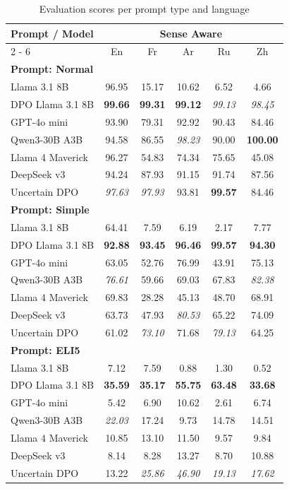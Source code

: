 \documentclass{article}%
\begin{document}
%
\normalsize%


\begin{table}[h!]%
\centering%
\small%
\setlength{\tabcolsep}{4pt}%
\begin{tabular}{@{}lccccc@{}}%
\toprule%
\textbf{Prompt / Model} & \multicolumn{5}{c}{\textbf{Sense Aware}} \\%
\cmidrule(lr){2%
-%
6}%
&En&Fr&Ar&Ru&Zh\\%
\midrule%
\multicolumn{6}{l}{\textbf{Prompt: Normal}} \\%
Llama 3.1 8B&96.95&15.17&10.62&6.52&4.66\\%
DPO Llama 3.1 8B&\textbf{99.66}&\textbf{99.31}&\textbf{99.12}&\textit{99.13}&\textit{98.45}\\%
GPT{-}4o mini&93.90&79.31&92.92&90.43&84.46\\%
Qwen3{-}30B A3B&94.58&86.55&\textit{98.23}&90.00&\textbf{100.00}\\%
Llama 4 Maverick&96.27&54.83&74.34&75.65&45.08\\%
DeepSeek v3&94.24&87.93&91.15&91.74&87.56\\%
Uncertain DPO&\textit{97.63}&\textit{97.93}&93.81&\textbf{99.57}&84.46\\%
\midrule%
\multicolumn{6}{l}{\textbf{Prompt: Simple}} \\%
Llama 3.1 8B&64.41&7.59&6.19&2.17&7.77\\%
DPO Llama 3.1 8B&\textbf{92.88}&\textbf{93.45}&\textbf{96.46}&\textbf{99.57}&\textbf{94.30}\\%
GPT{-}4o mini&63.05&52.76&76.99&43.91&75.13\\%
Qwen3{-}30B A3B&\textit{76.61}&59.66&69.03&67.83&\textit{82.38}\\%
Llama 4 Maverick&69.83&28.28&45.13&48.70&68.91\\%
DeepSeek v3&63.73&47.93&\textit{80.53}&65.22&74.09\\%
Uncertain DPO&61.02&\textit{73.10}&71.68&\textit{79.13}&64.25\\%
\midrule%
\multicolumn{6}{l}{\textbf{Prompt: ELI5}} \\%
Llama 3.1 8B&7.12&7.59&0.88&1.30&0.52\\%
DPO Llama 3.1 8B&\textbf{35.59}&\textbf{35.17}&\textbf{55.75}&\textbf{63.48}&\textbf{33.68}\\%
GPT{-}4o mini&5.42&6.90&10.62&2.61&6.74\\%
Qwen3{-}30B A3B&\textit{22.03}&17.24&9.73&14.78&14.51\\%
Llama 4 Maverick&10.85&13.10&11.50&9.57&9.84\\%
DeepSeek v3&8.14&8.28&13.27&8.70&10.88\\%
Uncertain DPO&13.22&\textit{25.86}&\textit{46.90}&\textit{19.13}&\textit{17.62}\\\bottomrule%
%
\end{tabular}%
\caption{Evaluation scores per prompt type and language}%
\end{table}

%
\end{document}
